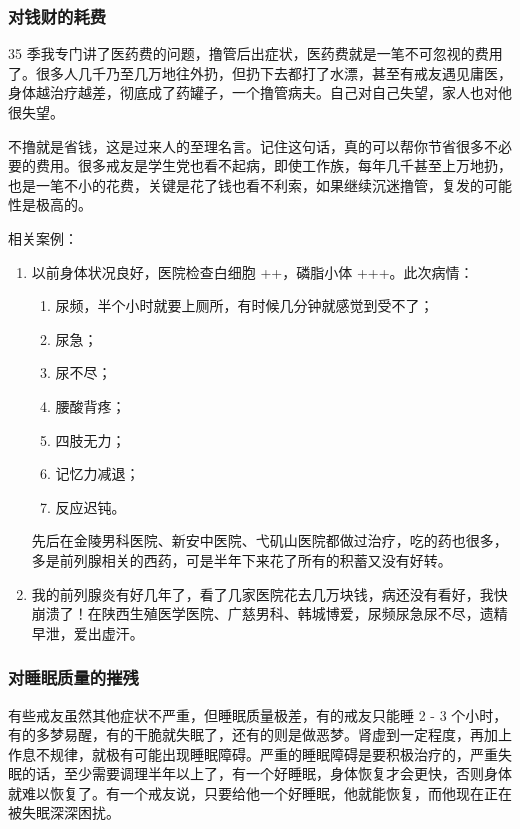 \documentclass[fontset=founder]{ctexart}
\begin{document}
\subsubsection{对钱财的耗费}

35 季我专门讲了医药费的问题，撸管后出症状，医药费就是一笔不可忽视的费用了。很多人几千乃至几万地往外扔，但扔下去都打了水漂，甚至有戒友遇见庸医，身体越治疗越差，彻底成了药罐子，一个撸管病夫。自己对自己失望，家人也对他很失望。

不撸就是省钱，这是过来人的至理名言。记住这句话，真的可以帮你节省很多不必要的费用。很多戒友是学生党也看不起病，即使工作族，每年几千甚至上万地扔，也是一笔不小的花费，关键是花了钱也看不利索，如果继续沉迷撸管，复发的可能性是极高的。

相关案例：

\begin{enumerate}
    \item 以前身体状况良好，医院检查白细胞 ++，磷脂小体 +++。此次病情：\begin{enumerate}
        \item 尿频，半个小时就要上厕所，有时候几分钟就感觉到受不了；
        \item 尿急；
        \item 尿不尽；
        \item 腰酸背疼；
        \item 四肢无力；
        \item 记忆力减退；
        \item 反应迟钝。
    \end{enumerate} 先后在金陵男科医院、新安中医院、弋矶山医院都做过治疗，吃的药也很多，多是前列腺相关的西药，可是半年下来花了所有的积蓄又没有好转。
    \item 我的前列腺炎有好几年了，看了几家医院花去几万块钱，病还没有看好，我快崩溃了！在陕西生殖医学医院、广慈男科、韩城博爱，尿频尿急尿不尽，遗精早泄，爱出虚汗。
\end{enumerate}

\subsubsection{对睡眠质量的摧残}

有些戒友虽然其他症状不严重，但睡眠质量极差，有的戒友只能睡 2 - 3 个小时，有的多梦易醒，有的干脆就失眠了，还有的则是做恶梦。肾虚到一定程度，再加上作息不规律，就极有可能出现睡眠障碍。严重的睡眠障碍是要积极治疗的，严重失眠的话，至少需要调理半年以上了，有一个好睡眠，身体恢复才会更快，否则身体就难以恢复了。有一个戒友说，只要给他一个好睡眠，他就能恢复，而他现在正在被失眠深深困扰。
\end{document}
